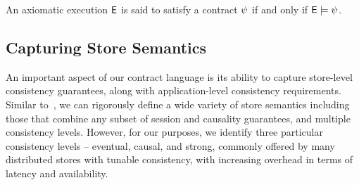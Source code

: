 \begin{definition}
An axiomatic execution ${\normalfont \textsf{E}}$ is said to satisfy a contract $\psi$ if and only if
${\normalfont \textsf{E}} \models \psi$.
\end{definition}

\subsection{Capturing Store Semantics}
\label{q_sec:store_sem}

An important aspect of our contract language is its ability to capture
store-level consistency guarantees, along with application-level consistency
requirements. Similar to~\cite{Burckhardt2014}, we can rigorously define a wide
variety of store semantics including those that combine any subset of session
and causality guarantees, and multiple consistency levels.  However, for our
purposes, we identify three particular consistency levels -- eventual, causal,
and strong, commonly offered by many distributed stores with tunable
consistency, with increasing overhead in terms of latency and availability.


